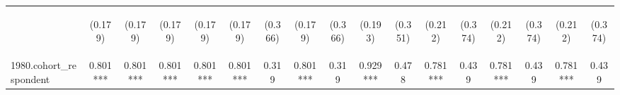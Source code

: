 \begin{center}
\begin{tabular}{lcccccccccccccccc}
\vspace{4pt} & \begin{footnotesize}(0.179)\end{footnotesize} & \begin{footnotesize}(0.179)\end{footnotesize} & \begin{footnotesize}(0.179)\end{footnotesize} & \begin{footnotesize}(0.179)\end{footnotesize} & \begin{footnotesize}(0.179)\end{footnotesize} & \begin{footnotesize}(0.366)\end{footnotesize} & \begin{footnotesize}(0.179)\end{footnotesize} & \begin{footnotesize}(0.366)\end{footnotesize} & \begin{footnotesize}(0.193)\end{footnotesize} & \begin{footnotesize}(0.351)\end{footnotesize} & \begin{footnotesize}(0.212)\end{footnotesize} & \begin{footnotesize}(0.374)\end{footnotesize} & \begin{footnotesize}(0.212)\end{footnotesize} & \begin{footnotesize}(0.374)\end{footnotesize} & \begin{footnotesize}(0.212)\end{footnotesize} & \begin{footnotesize}(0.374)\end{footnotesize} \\
1980.cohort\_respondent & 0.801*** & 0.801*** & 0.801*** & 0.801*** & 0.801*** & 0.319 & 0.801*** & 0.319 & 0.929*** & 0.478 & 0.781*** & 0.439 & 0.781*** & 0.439 & 0.781*** & 0.439 \\

\end{tabular}
\end{center}
